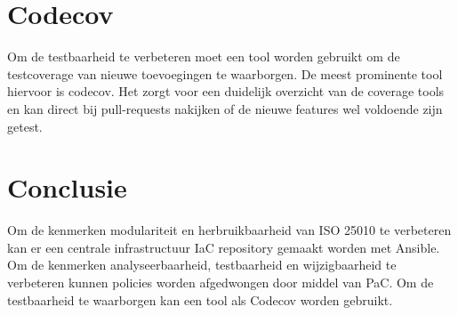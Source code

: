 \section{Codecov}
Om de testbaarheid te verbeteren moet een tool worden gebruikt om de testcoverage van nieuwe toevoegingen te waarborgen. De meest prominente tool hiervoor is codecov. Het zorgt voor een duidelijk overzicht van de coverage tools en kan direct bij pull-requests nakijken of de nieuwe features wel voldoende zijn getest.

\section{Conclusie}
Om de kenmerken modulariteit en herbruikbaarheid van ISO 25010 te verbeteren kan er een centrale infrastructuur IaC repository gemaakt worden met Ansible. Om de kenmerken analyseerbaarheid, testbaarheid en wijzigbaarheid te verbeteren kunnen policies worden afgedwongen door middel van PaC. Om de testbaarheid te waarborgen kan een tool als Codecov worden gebruikt.